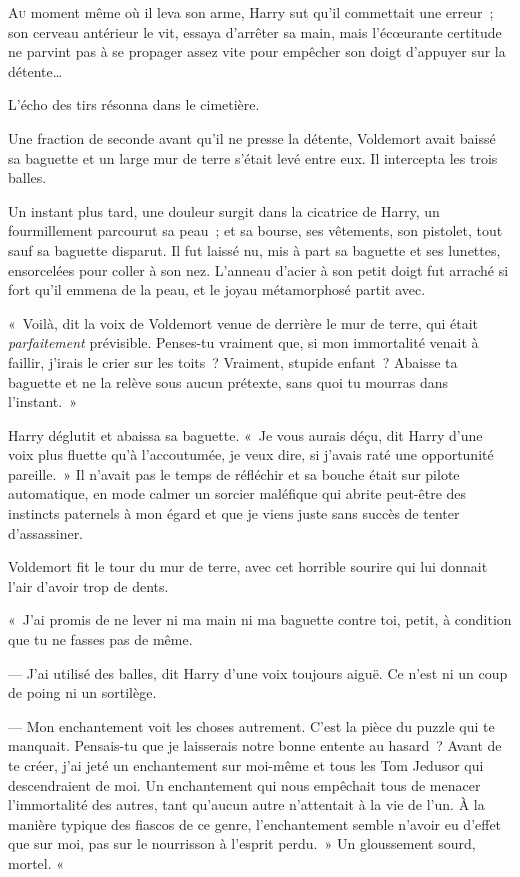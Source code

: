 
\lettrine{A}{u} moment même où il leva son arme, Harry sut qu'il commettait une erreur~; son cerveau antérieur le vit, essaya d'arrêter sa main, mais l'écœurante certitude ne parvint pas à se propager assez vite pour empêcher son doigt d'appuyer sur la détente…

L'écho des tirs résonna dans le cimetière.

Une fraction de seconde avant qu'il ne presse la détente, Voldemort avait baissé sa baguette et un large mur de terre s'était levé entre eux.
Il intercepta les trois balles.

Un instant plus tard, une douleur surgit dans la cicatrice de Harry, un fourmillement parcourut sa peau~; et sa bourse, ses vêtements, son pistolet, tout sauf sa baguette disparut.
Il fut laissé nu, mis à part sa baguette et ses lunettes, ensorcelées pour coller à son nez.
L'anneau d'acier à son petit doigt fut arraché si fort qu'il emmena de la peau, et le joyau métamorphosé partit avec.

«~Voilà, dit la voix de Voldemort venue de derrière le mur de terre, qui était \emph{parfaitement} prévisible.
Penses-tu vraiment que, si mon immortalité venait à faillir, j'irais le crier sur les toits~?
Vraiment, stupide enfant~?
Abaisse ta baguette et ne la relève sous aucun prétexte, sans quoi tu mourras dans l'instant.~»

Harry déglutit et abaissa sa baguette.
«~Je vous aurais déçu, dit Harry d'une voix plus fluette qu'à l'accoutumée, je veux dire, si j'avais raté une opportunité pareille.~»
Il n'avait pas le temps de réfléchir et sa bouche était sur pilote automatique, en mode calmer un sorcier maléfique qui abrite peut-être des instincts paternels à mon égard et que je viens juste sans succès de tenter d'assassiner.

Voldemort fit le tour du mur de terre, avec cet horrible sourire qui lui donnait l'air d'avoir trop de dents.

«~J'ai promis de ne lever ni ma main ni ma baguette contre toi, petit, à condition que tu ne fasses pas de même.

--- J'ai utilisé des balles, dit Harry d'une voix toujours aiguë.
Ce n'est ni un coup de poing ni un sortilège.

--- Mon enchantement voit les choses autrement.
C'est la pièce du puzzle qui te manquait.
Pensais-tu que je laisserais notre bonne entente au hasard~?
Avant de te créer, j'ai jeté un enchantement sur moi-même et tous les Tom Jedusor qui descendraient de moi.
Un enchantement qui nous empêchait tous de menacer l'immortalité des autres, tant qu'aucun autre n'attentait à la vie de l'un.
À la manière typique des fiascos de ce genre, l'enchantement semble n'avoir eu d'effet que sur moi, pas sur le nourrisson à l'esprit perdu.~»
Un gloussement sourd, mortel.
«~

